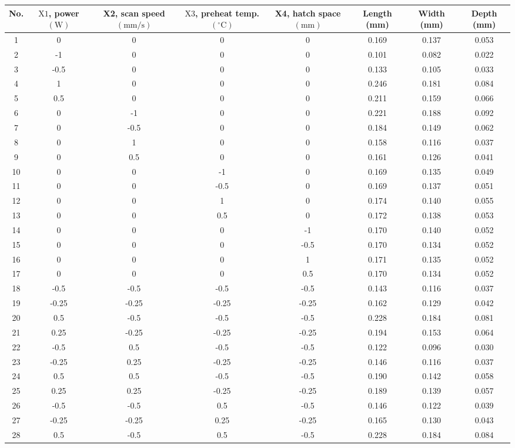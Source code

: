 \documentclass[10pt]{article}
\begin{document}
\begin{center}
\begin{tabular}{|c|c|c|c|c|c|c|c|}
\hline
No. & $\mathrm{X} 1$, power $(\mathrm{W})$ & X2, scan speed $(\mathrm{mm} / \mathrm{s})$ & $\mathrm{X} 3$, preheat temp. $\left({ }^{\circ} \mathrm{C}\right)$ & X4, hatch space $(\mathrm{mm})$ & Length (mm) & Width (mm) & Depth (mm) \\
\hline
1 & 0 & 0 & 0 & 0 & 0.169 & 0.137 & 0.053 \\
\hline
2 & -1 & 0 & 0 & 0 & 0.101 & 0.082 & 0.022 \\
\hline
3 & -0.5 & 0 & 0 & 0 & 0.133 & 0.105 & 0.033 \\
\hline
4 & 1 & 0 & 0 & 0 & 0.246 & 0.181 & 0.084 \\
\hline
5 & 0.5 & 0 & 0 & 0 & 0.211 & 0.159 & 0.066 \\
\hline
6 & 0 & -1 & 0 & 0 & 0.221 & 0.188 & 0.092 \\
\hline
7 & 0 & -0.5 & 0 & 0 & 0.184 & 0.149 & 0.062 \\
\hline
8 & 0 & 1 & 0 & 0 & 0.158 & 0.116 & 0.037 \\
\hline
9 & 0 & 0.5 & 0 & 0 & 0.161 & 0.126 & 0.041 \\
\hline
10 & 0 & 0 & -1 & 0 & 0.169 & 0.135 & 0.049 \\
\hline
11 & 0 & 0 & -0.5 & 0 & 0.169 & 0.137 & 0.051 \\
\hline
12 & 0 & 0 & 1 & 0 & 0.174 & 0.140 & 0.055 \\
\hline
13 & 0 & 0 & 0.5 & 0 & 0.172 & 0.138 & 0.053 \\
\hline
14 & 0 & 0 & 0 & -1 & 0.170 & 0.140 & 0.052 \\
\hline
15 & 0 & 0 & 0 & -0.5 & 0.170 & 0.134 & 0.052 \\
\hline
16 & 0 & 0 & 0 & 1 & 0.171 & 0.135 & 0.052 \\
\hline
17 & 0 & 0 & 0 & 0.5 & 0.170 & 0.134 & 0.052 \\
\hline
18 & -0.5 & -0.5 & -0.5 & -0.5 & 0.143 & 0.116 & 0.037 \\
\hline
19 & -0.25 & -0.25 & -0.25 & -0.25 & 0.162 & 0.129 & 0.042 \\
\hline
20 & 0.5 & -0.5 & -0.5 & -0.5 & 0.228 & 0.184 & 0.081 \\
\hline
21 & 0.25 & -0.25 & -0.25 & -0.25 & 0.194 & 0.153 & 0.064 \\
\hline
22 & -0.5 & 0.5 & -0.5 & -0.5 & 0.122 & 0.096 & 0.030 \\
\hline
23 & -0.25 & 0.25 & -0.25 & -0.25 & 0.146 & 0.116 & 0.037 \\
\hline
24 & 0.5 & 0.5 & -0.5 & -0.5 & 0.190 & 0.142 & 0.058 \\
\hline
25 & 0.25 & 0.25 & -0.25 & -0.25 & 0.189 & 0.139 & 0.057 \\
\hline
26 & -0.5 & -0.5 & 0.5 & -0.5 & 0.146 & 0.122 & 0.039 \\
\hline
27 & -0.25 & -0.25 & 0.25 & -0.25 & 0.165 & 0.130 & 0.043 \\
\hline
28 & 0.5 & -0.5 & 0.5 & -0.5 & 0.228 & 0.184 & 0.084 \\
\hline
\end{tabular}
\end{center}
\end{document}

